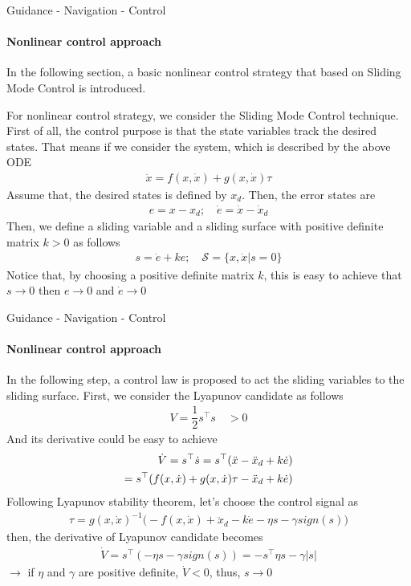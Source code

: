 \begin{frame}{Guidance - Navigation - Control}
	\framesubtitle{Nonlinear control approach}
	{\color{red} In the following section, a basic nonlinear control strategy that based on Sliding Mode Control is introduced.}
	
	
	For nonlinear control strategy, we consider the Sliding Mode Control technique. First of all, the control purpose is that the state variables track the desired states. That means if we consider the system, which is described by the above ODE
	\begin{align}
		\ddot{{x}} = f({x}, \dot{{x}}) + g({x}, \dot{{x}})\tau
	\end{align}
	Assume that, the desired states is defined by ${x}_d$. Then, the error states are
	\begin{align}
		{e} = {x} - {x}_d; \quad \dot{{e}} = \dot{{x}} - \dot{{x}}_d
	\end{align}
	Then, we define a sliding variable and a sliding surface with positive definite matrix ${k} > 0$ as follows
	\begin{align}
		{s} = \dot{{e}} + {k}{e} ; \quad \mathcal{S} = \{{x}, \dot{{x}} | {s} = {0}\}
	\end{align}
	{\color{red} Notice that, by choosing a positive definite matrix ${k}$, this is easy to achieve that ${s} \to {0}$ then ${e} \to {0}$ and $\dot{{e}} \to {0}$}
\end{frame}






\begin{frame}{Guidance - Navigation - Control}
	\framesubtitle{Nonlinear control approach}
	In the following step, a control law is proposed to act the sliding variables to the sliding surface. First, we consider the Lyapunov candidate as follows
	\begin{align}
		V = \dfrac{1}{2}{s}^\top{s} \quad > 0
	\end{align}
	And its derivative could be easy to achieve
	\begin{align}
		\dot{V} = {s}^\top\dot{{s}} = {s}^\top(\ddot{{x}} - \ddot{{x}}_d + {k}\dot{{e}}) \notag\\
		= {s}^\top(f({x}, \dot{{x}}) + g({x}, \dot{{x}})\tau - \ddot{{x}}_d + {k}\dot{{e}})
	\end{align}
	Following Lyapunov stability theorem, let's choose the control signal as 
	\begin{align}
		\tau = g({x}, \dot{{x}})^{-1}\big(-f({x}, \dot{{x}}) + \ddot{{x}}_d - {k}\dot{{e}} - \eta{s} - \gamma sign({s})\big)
	\end{align}
	then, the derivative of Lyapunov candidate becomes
	\begin{align}
		\dot{V} = {s}^\top(-\eta{s} - \gamma sign({s})) = -{s}^\top\eta{s} - \gamma |{s}|
	\end{align}
	$\to$ if $\eta$ and $\gamma$ are positive definite, $\dot{V} < 0$, thus, ${s} \to {0}$
\end{frame}



